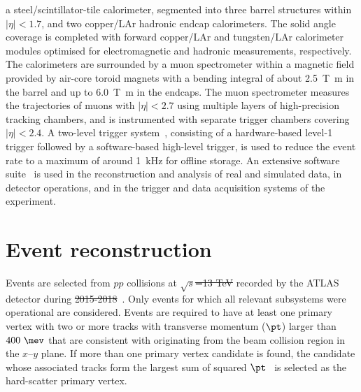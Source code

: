 \documentclass[PAPER, coverpage, atlasdraft=true, texlive=2016, UKenglish]{\ATLASLATEXPATH atlasdoc}
\providecommand{\DIFadd}[1]{{\protect\color{blue}\uwave{#1}}} %
\providecommand{\DIFdel}[1]{{\protect\color{red}\sout{#1}}}                      %
\providecommand{\DIFaddbegin}{} %
\providecommand{\DIFaddend}{} %
\providecommand{\DIFdelbegin}{} %
\providecommand{\DIFdelend}{} %
\begin{document}
a steel/scintillator-tile calorimeter, segmented into three barrel structures within $|\eta| < 1.7$, and two copper/LAr hadronic endcap calorimeters.
The solid angle coverage is completed with forward copper/LAr and tungsten/LAr calorimeter modules optimised for electromagnetic and hadronic measurements, respectively.
The calorimeters are surrounded by a muon spectrometer within a magnetic field provided by air-core toroid magnets with a bending integral of about \SI{2.5}{\tesla\metre} in the barrel and up to \SI{6.0}{\tesla\metre} in the endcaps. 
The muon spectrometer measures the trajectories of muons with $|\eta|<2.7$ using multiple layers of high-precision tracking chambers, and \DIFaddbegin \DIFadd{it }\DIFaddend is instrumented with separate trigger chambers covering $|\eta|<2.4$. A two-level trigger system~\cite{Aaboud:2016leb}, consisting of a hardware-based level-1 trigger followed by a software-based high-level trigger, is used to reduce the event rate to a maximum of around \SI{1}{\kHz} for offline storage.
An extensive software suite~\cite{ATL-SOFT-PUB-2021-001} is used in the reconstruction and analysis of real and simulated data, in detector operations, and in the trigger and data acquisition systems of the experiment.


\section{Event reconstruction}
\label{sec:objects}

Events are selected from $pp$ collisions at \DIFdelbegin \DIFdel{$\sqrt{s}$=13 TeV }\DIFdelend \DIFaddbegin \DIFadd{$\sqrt{s}=13$~}\TeV\DIFadd{\ }\DIFaddend recorded by the ATLAS detector during \DIFdelbegin \DIFdel{2015-2018}\DIFdelend \DIFaddbegin \DIFadd{2015--2018}\DIFaddend ~\cite{DAPR-2018-01}.
Only events for which all relevant subsystems were operational are considered.
Events are required to have at least one primary vertex with two or more tracks with transverse momentum
($\pt$) larger than $400~\mev$ that are consistent with originating from the 
beam collision region in the $x$--$y$ plane. If more than one primary vertex candidate is found, the
candidate whose associated tracks form the largest sum of squared $\pt$~\cite{ATL-PHYS-PUB-2015-026}
is selected as the hard-scatter primary vertex.
\end{document}
